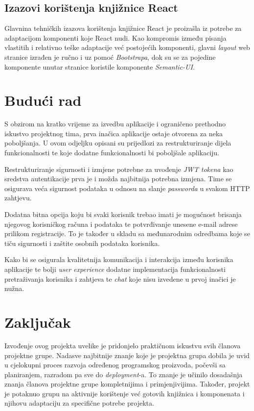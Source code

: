 	
		
		\subsection{Izazovi korištenja knjižnice React}
		Glavnina tehničkih izazova korištenja knjižnice React je proizašla iz potrebe za adaptacijom komponenti koje React nudi. Kao kompromis između pisanja vlastitih i relativno teške adaptacije već postojećih komponenti, glavni \textit{layout} web stranice izrađen je ručno i uz pomoć \textit{Bootstrapa}, dok su se za pojedine komponente unutar stranice koristile komponente \textit{Semantic-UI}.
		
		
		 
		 \section{Budući rad}
		 S obzirom na kratko vrijeme za izvedbu aplikacije i ograničeno prethodno iskustvo projektnog tima, prva inačica aplikacije ostaje otvorena za neka poboljšanja. U ovom odjeljku opisani su prijedlozi za restrukturiranje dijela funkcionalnosti te koje dodatne funkcionalnosti bi poboljšale aplikaciju.\newline 
		 
		 Restrukturiranje sigurnosti i izmjene potrebne za uvođenje \textit{JWT tokena} kao sredstva autentikacije prva je i možda najbitnija potrebna izmjena. Time se osigurava veća sigurnost podataka u odnosu na slanje \textit{passworda} u svakom HTTP zahtjevu.
		 
		 Dodatna bitna opcija koju bi svaki korisnik trebao imati je mogućnost brisanja njegovog korisničkog računa i podataka te potvrđivanje unesene e-mail adrese prilikom registracije. To je također u skladu sa međunarodnim odredbama koje se tiču sigurnosti i zaštite osobnih podataka korisnika. 
		 
		 Kako bi se osigurala kvalitetnija komunikacija i interakcija između korisnika aplikacije te bolji \textit{user experience} dodatne implementacija funkcionalnosti pretraživanja korisnika i zahtjeva te \textit{chat} koje nisu izvedene u prvoj inačici je nužna.
		 
		 
		 \section{Zaključak}
		 Izvođenje ovog projekta uvelike je pridonjelo praktičnom iskustvu svih članova projektne grupe. Nadasve najbitnije znanje koje je projektna grupa dobila je uvid u cjelokupni proces razvoja određenog programskog proizvoda, počevši sa planiranjem, razradom pa sve do \textit{deployment}-a. To znanje je učinilo dosadašnja znanja članova projektne grupe kompletnijima i primjenjivijima. Također, projekt je potaknuo grupu na aktivnije korištenje već gotovih knjižnica i komponenata i njihovu adaptaciju za specifične potrebe projekta.
		 \eject
		 
		 
		
		\eject 